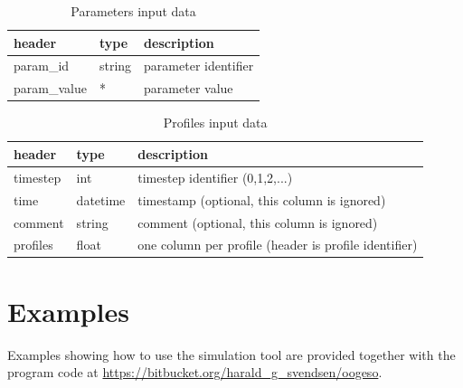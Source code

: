\documentclass[12pt]{article}
\begin{document}
\begin{table}[h]
\caption{Parameters input data}
\begin{tabular}{lll}
	\hline
	header & type & description \\
	\hline
	param\_id & string & parameter identifier \\
	param\_value & * & parameter value
\end{tabular}
\end{table}

\begin{table}[h]
\caption{Profiles input data}
\begin{tabular}{lll}
	\hline
	header & type & description \\
	\hline
	timestep & int & timestep identifier (0,1,2,...) \\
	time & datetime & timestamp (optional, this column is ignored) \\
	comment & string & comment (optional, this column is ignored) \\
	profiles & float & one column per profile (header is profile identifier)\\
\end{tabular}
\end{table}


\section{Examples}

Examples showing how to use the simulation tool are provided together with the program code at
\url{https://bitbucket.org/harald_g_svendsen/oogeso}.





\printbibliography
\end{document}
